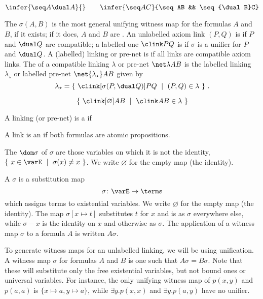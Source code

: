 \[
	\infer{\seq A{\dual A}}{}
\qquad
	\infer{\seq AC}{\seq AB && \seq{\dual B}C}
\]



The  $\sigma(A,B)$ is the most general unifying witness map for the formulas $A$ and $B$, if it exists; if it does, $A$ and $B$ are . An unlabelled axiom link $(P,Q)$ is  if $P$ and $\dual Q$ are compatible; a labelled one $\clink PQ$ is  if $\sigma$ is a unifier for $P$ and $\dual Q$. A (labelled) linking or pre-net is  if all links are compatible axiom links. The  of a compatible linking $\lambda$ or pre-net $\net\lambda AB$ is the labelled linking $\lambda_\star$ or labelled pre-net $\net{\lambda_\star}AB$ given by
\[
	\lambda_\star = \{~\clink[\sigma(P,\dual Q)]PQ~\mid~(P,Q)\in\lambda~\}~.
\]


\[
	\{~\clink[\varnothing]AB~\mid~\clink AB\in\lambda~\}
\]




A linking (or pre-net) is a  if 





A link is an  if both formulas are atomic propositions.%

The  $\dom\sigma$ of $\sigma$ are those variables on which it is not the identity, $\{~x\in\varE~\mid~\sigma(x)\neq x~\}$. We write $\varnothing$ for the empty map (the identity). 

A  $\sigma$ is a substitution map
\[
	\sigma\colon \varE \to \terms
\]
which assigns terms to existential variables. We write $\varnothing$ for the empty map (the identity). The map $\sigma[x\mapsto t]$ substitutes $t$ for $x$ and is as $\sigma$ everywhere else, while $\sigma\minus x$ is the identity on $x$ and otherwise as $\sigma$. The application of a witness map $\sigma$ to a formula $A$ is written $A\sigma$. 
 



To generate witness maps for an unlabelled linking, we will be using unification. A  witness map $\sigma$ for formulas $A$ and $B$ is one such that $A\sigma=B\sigma$. Note that these will substitute only the free existential variables, but not bound ones or universal variables. For instance, the only unifying witness map of $p(x,y)$ and $p(a,a)$ is $\{x\mapsto a,y\mapsto a\}$, while $\exists y.p(x,x)$ and $\exists y.p(a,y)$ have no unifier.

